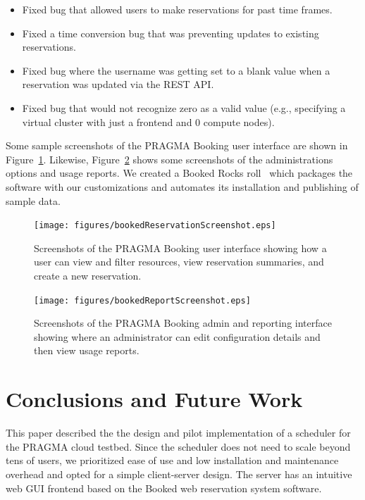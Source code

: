 \documentclass[times]{cpeauth}
\begin{document}
\begin{itemize}
\item Fixed bug that allowed users to make reservations for past time frames.
\item Fixed a time conversion bug that was preventing updates to existing reservations.
\item Fixed bug where the username was getting set to a blank value when a reservation was updated via the REST API. 
\item Fixed bug that would not recognize zero as a valid value (e.g., specifying a virtual cluster with just a frontend and 0 compute nodes).  
\end{itemize}

Some sample screenshots of the PRAGMA Booking user interface are shown in Figure~\ref{Fig:Booked}.  Likewise, Figure~\ref{Fig:Reports} shows some screenshots of the administrations options and usage reports.  We created a  Booked Rocks roll~\cite{cloudscheduler} which packages the software with our customizations and automates its installation and publishing of sample data.

\begin{figure}[htbp] 
\begin{center}
\texttt{[image: figures/bookedReservationScreenshot.eps]}
\caption{Screenshots of the PRAGMA Booking user interface showing how a user can view and filter resources, view reservation summaries, and create a new reservation.}
\label{Fig:Booked}
\end{center}
\end{figure}

\begin{figure}[htbp]
\begin{center}
\texttt{[image: figures/bookedReportScreenshot.eps]}
\caption{Screenshots of the PRAGMA Booking admin and reporting interface showing where an administrator can edit configuration details and then view usage reports.}
\label{Fig:Reports}
\end{center}
\end{figure}

\section{Conclusions and Future Work}
\label{Sec:Conclusions}

This paper described the the design and pilot implementation of a  scheduler for the PRAGMA cloud testbed.  Since the scheduler does not need to scale beyond tens of users, we prioritized ease of use and low installation and maintenance overhead and opted for a simple client-server design.  The server has an intuitive web GUI frontend based on the Booked web reservation system software.  
\end{document}

